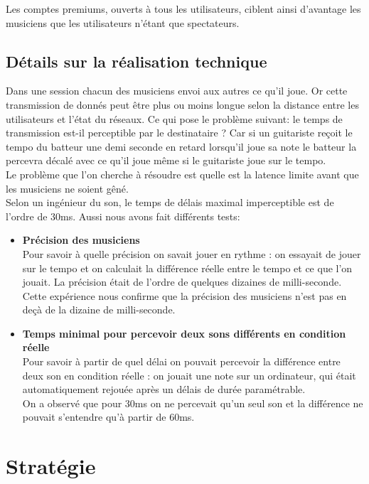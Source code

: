 \documentclass[a4,12pt]{article}
\begin{document}
Les comptes premiums, ouverts à tous les utilisateurs, ciblent ainsi d'avantage les musiciens que les utilisateurs n'étant que spectateurs.

\subsection{Détails sur la réalisation technique}

Dans une session chacun des musiciens envoi aux autres ce qu’il joue. Or cette transmission de donnés peut être plus ou moins longue selon la distance entre les utilisateurs et l’état du réseaux. Ce qui pose le problème suivant: le temps de transmission est-il perceptible par le destinataire ? Car si un guitariste reçoit le tempo du batteur une demi seconde en retard lorsqu’il joue sa note le batteur la percevra décalé avec ce qu’il joue même si le guitariste joue sur le tempo.\\
Le problème que l’on cherche à résoudre est quelle est la latence limite avant que les musiciens ne soient gêné.\\
Selon un ingénieur du son, le temps de délais maximal imperceptible est de l’ordre de 30ms. Aussi nous avons fait différents tests:
\begin{itemize}
    \item \textbf{Précision des musiciens}\\
    Pour savoir à quelle précision on savait jouer en rythme : on essayait de jouer sur le tempo et on calculait la différence réelle entre le tempo et ce que l’on jouait. La précision était de l’ordre de quelques dizaines de milli-seconde.\\
    Cette expérience nous confirme que la précision des musiciens n’est pas en deçà de la dizaine de milli-seconde.
    \item \textbf{Temps minimal pour percevoir deux sons différents en condition réelle}\\
    Pour savoir à partir de quel délai on pouvait percevoir la différence entre deux son en condition réelle : on jouait une note sur un ordinateur, qui était automatiquement rejouée après un délais de durée paramétrable.
    \\
    On a observé que pour 30ms on ne percevait qu’un seul son et la différence ne pouvait s’entendre qu’à partir de 60ms.
\end{itemize}
\newpage
\section{Stratégie}
\end{document}
